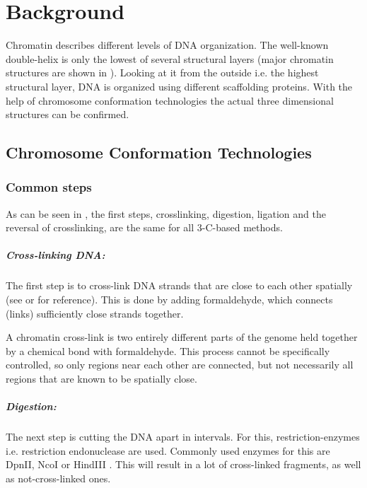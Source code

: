 \chapter{Background}\label{chap:background}



Chromatin describes different levels of DNA organization. The well-known
double-helix is only the lowest of several structural layers (major chromatin
structures are shown in ). Looking at it from the outside
i.e. the highest structural layer, DNA is organized using different scaffolding
proteins. With the help of chromosome conformation technologies the actual
three dimensional structures can be confirmed.




\section{Chromosome Conformation Technologies}\label{sec:cct}

\subsection{Common steps}\label{sec:common}

As can be seen in , the first steps, crosslinking, digestion,
ligation and the reversal of crosslinking, are the same for all 3-C-based methods.


\paragraph{Cross-linking DNA:}\label{sec:crosslinking}
The first step is to cross-link DNA strands that are close to each other
spatially (see  or  for reference). This is done by adding
formaldehyde, which connects (links) sufficiently close strands together.

A chromatin cross-link is two entirely different parts of the genome held
together by a chemical bond with formaldehyde. This process cannot be
specifically controlled, so only regions near each other are connected, but
not necessarily all regions that are known to be spatially close.


\paragraph{Digestion:}\label{sec:digestion}
The next step is cutting the DNA apart in intervals. For this,
restriction-enzymes i.e. restriction endonuclease are used. Commonly used
enzymes for this are DpnII, NcoI or HindIII \cite{lieberman2009comprehensive}.
This will result in a lot of cross-linked fragments, as well as
not-cross-linked ones.


